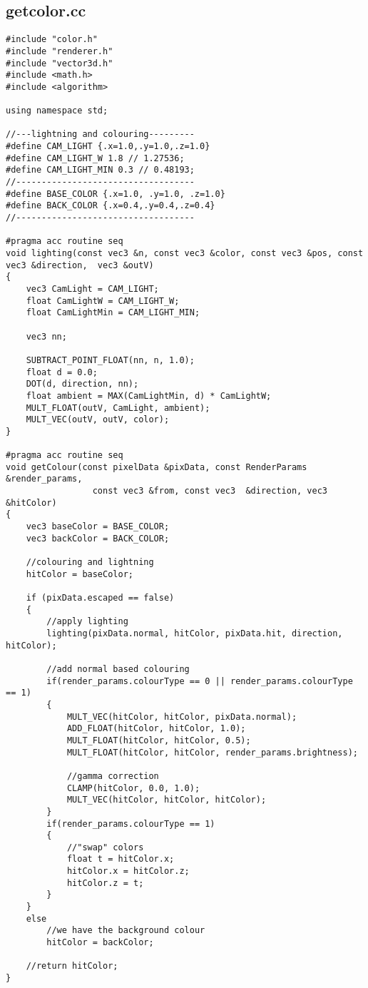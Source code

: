 \documentclass[]{article}
\begin{document}
\subsection*{getcolor.cc}
\begin{Verbatim}[fontsize= \footnotesize, tabsize=4]
#include "color.h"
#include "renderer.h"
#include "vector3d.h"
#include <math.h>
#include <algorithm>

using namespace std;

//---lightning and colouring---------
#define CAM_LIGHT {.x=1.0,.y=1.0,.z=1.0}
#define CAM_LIGHT_W 1.8 // 1.27536;
#define CAM_LIGHT_MIN 0.3 // 0.48193;
//-----------------------------------
#define BASE_COLOR {.x=1.0, .y=1.0, .z=1.0}
#define BACK_COLOR {.x=0.4,.y=0.4,.z=0.4}
//-----------------------------------

#pragma acc routine seq
void lighting(const vec3 &n, const vec3 &color, const vec3 &pos, const vec3 &direction,  vec3 &outV)
{
	vec3 CamLight = CAM_LIGHT;
	float CamLightW = CAM_LIGHT_W;
	float CamLightMin = CAM_LIGHT_MIN;

	vec3 nn;

	SUBTRACT_POINT_FLOAT(nn, n, 1.0);
	float d = 0.0;
	DOT(d, direction, nn);
	float ambient = MAX(CamLightMin, d) * CamLightW;
	MULT_FLOAT(outV, CamLight, ambient);
	MULT_VEC(outV, outV, color);
}

#pragma acc routine seq
void getColour(const pixelData &pixData, const RenderParams &render_params,
				 const vec3 &from, const vec3  &direction, vec3  &hitColor)
{
	vec3 baseColor = BASE_COLOR;
	vec3 backColor = BACK_COLOR;

	//colouring and lightning
	hitColor = baseColor;

	if (pixData.escaped == false)
	{
		//apply lighting
		lighting(pixData.normal, hitColor, pixData.hit, direction, hitColor);

		//add normal based colouring
		if(render_params.colourType == 0 || render_params.colourType == 1)
		{
			MULT_VEC(hitColor, hitColor, pixData.normal);
			ADD_FLOAT(hitColor, hitColor, 1.0);
			MULT_FLOAT(hitColor, hitColor, 0.5);
			MULT_FLOAT(hitColor, hitColor, render_params.brightness);

			//gamma correction
			CLAMP(hitColor, 0.0, 1.0);
			MULT_VEC(hitColor, hitColor, hitColor);
		}
		if(render_params.colourType == 1)
		{
			//"swap" colors
			float t = hitColor.x;
			hitColor.x = hitColor.z;
			hitColor.z = t;
		}
	}
	else
		//we have the background colour
		hitColor = backColor;

	//return hitColor;
}
\end{Verbatim}
\end{document}
